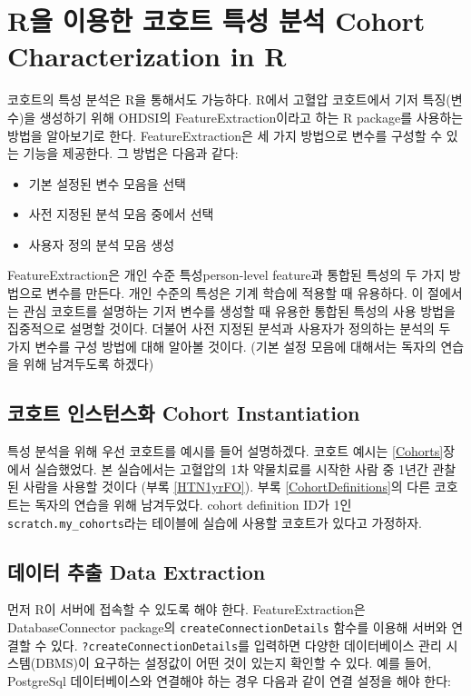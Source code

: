 \documentclass[10.5pt]{book}
\providecommand{\tightlist}{%
  \setlength{\itemsep}{0pt}\setlength{\parskip}{0pt}}
\theoremstyle{definition}
\theoremstyle{definition}
\theoremstyle{definition}
\theoremstyle{remark}
\begin{document}
\section{R을 이용한 코호트 특성 분석 Cohort Characterization in
R}\label{r-----cohort-characterization-in-r}

코호트의 특성 분석은 R을 통해서도 가능하다. R에서 고혈압 코호트에서 기저
특징(변수)을 생성하기 위해 OHDSI의 FeatureExtraction이라고 하는 R
package를 사용하는 방법을 알아보기로 한다. FeatureExtraction은 세 가지
방법으로 변수를 구성할 수 있는 기능을 제공한다. 그 방법은 다음과 같다:

\begin{itemize}
\tightlist
\item
  기본 설정된 변수 모음을 선택
\item
  사전 지정된 분석 모음 중에서 선택
\item
  사용자 정의 분석 모음 생성
\end{itemize}

FeatureExtraction은 개인 수준 특성person-level feature과 통합된 특성의
두 가지 방법으로 변수를 만든다. 개인 수준의 특성은 기계 학습에 적용할 때
유용하다. 이 절에서는 관심 코호트를 설명하는 기저 변수를 생성할 때
유용한 통합된 특성의 사용 방법을 집중적으로 설명할 것이다. 더불어 사전
지정된 분석과 사용자가 정의하는 분석의 두 가지 변수를 구성 방법에 대해
알아볼 것이다. (기본 설정 모음에 대해서는 독자의 연습을 위해 남겨두도록
하겠다)

\subsection{코호트 인스턴스화 Cohort
Instantiation}\label{--cohort-instantiation}

특성 분석을 위해 우선 코호트를 예시를 들어 설명하겠다. 코호트 예시는
\ref{Cohorts}장에서 실습했었다. 본 실습에서는 고혈압의 1차 약물치료를
시작한 사람 중 1년간 관찰된 사람을 사용할 것이다 (부록 \ref{HTN1yrFO}).
부록 \ref{CohortDefinitions}의 다른 코호트는 독자의 연습을 위해
남겨두었다. cohort definition ID가 1인 \texttt{scratch.my\_cohorts}라는
테이블에 실습에 사용할 코호트가 있다고 가정하자.

\subsection{데이터 추출 Data Extraction}\label{--data-extraction}

먼저 R이 서버에 접속할 수 있도록 해야 한다. FeatureExtraction은
DatabaseConnector package의 \texttt{createConnectionDetails} 함수를
이용해 서버와 연결할 수 있다. \texttt{?createConnectionDetails}를
입력하면 다양한 데이터베이스 관리 시스템(DBMS)이 요구하는 설정값이 어떤
것이 있는지 확인할 수 있다. 예를 들어, PostgreSql 데이터베이스와
연결해야 하는 경우 다음과 같이 연결 설정을 해야 한다:
\end{document}
